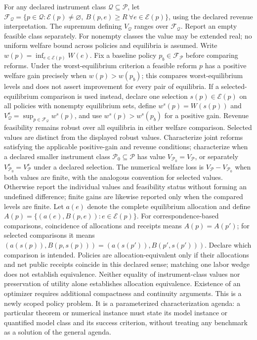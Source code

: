 \documentclass[11pt,a4paper]{article}
\begin{document}
For any declared instrument class \(\mathcal Q\subseteq\mathcal P\), let \(\mathcal F_{\mathcal Q}=\{p\in\mathcal Q:\mathcal E(p)\ne\varnothing,\ B(p,e)\geq R\ \forall e\in\mathcal E(p)\}\), using the declared revenue interpretation. The supremum defining \(V_{\mathcal Q}\) ranges over \(\mathcal F_{\mathcal Q}\). Report an empty feasible class separately. For nonempty classes the value may be extended real; no uniform welfare bound across policies and equilibria is assumed. Write \(w(p)=\inf_{e\in\mathcal E(p)}W(e)\). Fix a baseline policy \(p_b\in\mathcal F_{\mathcal P}\) before comparing reforms. Under the worst-equilibrium criterion a feasible reform \(p\) has a positive welfare gain precisely when \(w(p)>w(p_b)\); this compares worst-equilibrium levels and does not assert improvement for every pair of equilibria. If a selected-equilibrium comparison is used instead, declare one selection \(s(p)\in\mathcal E(p)\) on all policies with nonempty equilibrium sets, define \(w^s(p)=W(s(p))\) and \(V^s_{\mathcal Q}=\sup_{p\in\mathcal F_{\mathcal Q}}w^s(p)\), and use \(w^s(p)>w^s(p_b)\) for a positive gain. Revenue feasibility remains robust over all equilibria in either welfare comparison. Selected values are distinct from the displayed robust values. Characterize joint reforms satisfying the applicable positive-gain and revenue conditions; characterize when a declared smaller instrument class \(\mathcal P_0\subseteq\mathcal P\) has value \(V_{\mathcal P_0}=V_{\mathcal P}\), or separately \(V^s_{\mathcal P_0}=V^s_{\mathcal P}\) under a declared selection. The numerical welfare loss is \(V_{\mathcal P}-V_{\mathcal P_0}\) when both values are finite, with the analogous convention for selected values. Otherwise report the individual values and feasibility status without forming an undefined difference; finite gains are likewise reported only when the compared levels are finite. Let \(a(e)\) denote the complete equilibrium allocation and define \(A(p)=\{(a(e),B(p,e)):e\in\mathcal E(p)\}\). For correspondence-based comparisons, coincidence of allocations and receipts means \(A(p)=A(p')\); for selected comparisons it means \((a(s(p)),B(p,s(p)))=(a(s(p')),B(p',s(p')))\). Declare which comparison is intended. Policies are allocation-equivalent only if their allocations and net public receipts coincide in this declared sense; matching one labor wedge does not establish equivalence. Neither equality of instrument-class values nor preservation of utility alone establishes allocation equivalence. Existence of an optimizer requires additional compactness and continuity arguments. This is a newly scoped policy problem. It is a parameterized characterization agenda: a particular theorem or numerical instance must state its model instance or quantified model class and its success criterion, without treating any benchmark as a solution of the general agenda.
\end{document}
